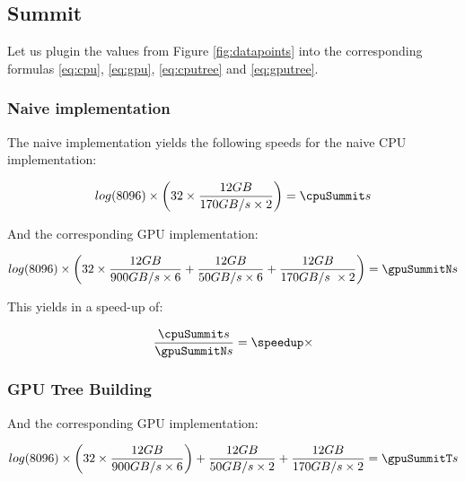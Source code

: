 \documentclass[]{article}
\begin{document}
\subsection{Summit}

Let us plugin the values from Figure \ref{fig:datapoints} into the corresponding formulas \ref{eq:cpu}, \ref{eq:gpu}, \ref{eq:cputree} and \ref{eq:gputree}.

\subsubsection{Naive implementation}
The naive implementation yields the following speeds for the naive CPU  implementation:

\pgfmathsetmacro{}
\begin{center}
	\begin{equation}
		log(\d) \times \left ( \p \times \frac{ \s GB }{170 GB/s \times 2} \right ) = \cpuSummit s
	\end{equation}
\end{center}

And the corresponding GPU implementation:
\pgfmathsetmacro{}
\begin{center}
	\begin{equation}
		log(\d) \times \left ( \p \times \frac{\s GB}{900 GB/s \times 6} + \frac{\s GB}{50 GB/s \times 6}  + \frac{\s GB}{170 GB/s \ \times 2} \right )= \gpuSummitN s
	\end{equation}
\end{center}

This yields in a speed-up of:
\pgfmathsetmacro\speedup{\cpuSummit / \gpuSummitN}
\begin{center}
	\begin{equation}
		\frac{\cpuSummit s}{\gpuSummitN s} = \speedup \times 
	\end{equation}
\end{center}


\subsubsection{GPU Tree Building}

And the corresponding GPU implementation:
\pgfmathsetmacro{}
 
\begin{center}
	\begin{equation}
		log(\d) \times \left ( \p \times \frac{\s GB}{900 GB/s \times 6} \right ) + \frac{\s GB}{50 GB/s \times 2}  + \frac{\s GB}{170 GB/s \times 2} = \gpuSummitT s
	\end{equation}
\end{center}
\end{document}
